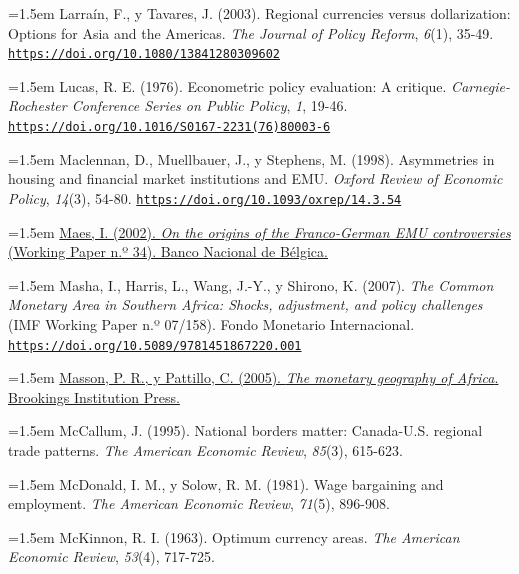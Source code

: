 \documentclass[10pt,a4paper]{article}
\begin{document}
\noindent\hangindent=1.5em Larraín, F., y Tavares, J. (2003). Regional currencies versus dollarization: Options for Asia and the Americas. \textit{The Journal of Policy Reform}, \textit{6}(1), 35-49. \href{https://doi.org/10.1080/13841280309602}{\nolinkurl{https://doi.org/10.1080/13841280309602}}

\noindent\hangindent=1.5em Lucas, R. E. (1976). Econometric policy evaluation: A critique. \textit{Carnegie-Rochester Conference Series on Public Policy}, \textit{1}, 19-46. \href{https://doi.org/10.1016/S0167-2231(76)80003-6}{\nolinkurl{https://doi.org/10.1016/S0167-2231(76)80003-6}}

\noindent\hangindent=1.5em Maclennan, D., Muellbauer, J., y Stephens, M. (1998). Asymmetries in housing and financial market institutions and EMU. \textit{Oxford Review of Economic Policy}, \textit{14}(3), 54-80. \href{https://doi.org/10.1093/oxrep/14.3.54}{\nolinkurl{https://doi.org/10.1093/oxrep/14.3.54}}

\noindent\hangindent=1.5em \href{https://www.nbb.be/doc/ts/publications/wp/wp34en.pdf}{Maes, I. (2002). \textit{On the origins of the Franco-German EMU controversies} (Working Paper n.º 34). Banco Nacional de Bélgica.}

\noindent\hangindent=1.5em Masha, I., Harris, L., Wang, J.-Y., y Shirono, K. (2007). \textit{The Common Monetary Area in Southern Africa: Shocks, adjustment, and policy challenges} (IMF Working Paper n.º 07/158). Fondo Monetario Internacional. \href{https://doi.org/10.5089/9781451867220.001}{\nolinkurl{https://doi.org/10.5089/9781451867220.001}}

\noindent\hangindent=1.5em \href{https://www.brookings.edu/books/the-monetary-geography-of-africa/}{Masson, P. R., y Pattillo, C. (2005). \textit{The monetary geography of Africa}. Brookings Institution Press.}

\noindent\hangindent=1.5em McCallum, J. (1995). National borders matter: Canada-U.S. regional trade patterns. \textit{The American Economic Review}, \textit{85}(3), 615-623.

\noindent\hangindent=1.5em McDonald, I. M., y Solow, R. M. (1981). Wage bargaining and employment. \textit{The American Economic Review}, \textit{71}(5), 896-908.

\noindent\hangindent=1.5em McKinnon, R. I. (1963). Optimum currency areas. \textit{The American Economic Review}, \textit{53}(4), 717-725.
\end{document}
